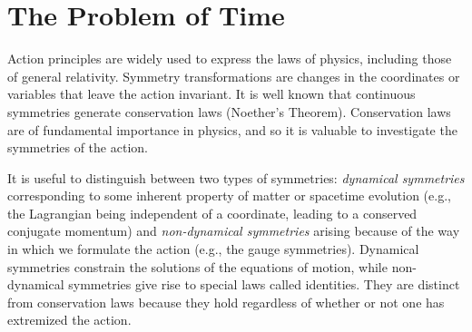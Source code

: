 \chapter{The Problem of Time\label{appen:problemoftime}}

Action principles are widely used to express the laws of physics, including those of
general relativity.  Symmetry transformations are changes in the coordinates or
variables that leave the action invariant. It is well known that continuous symmetries
generate conservation laws (Noether’s Theorem). Conservation laws are of fundamental importance in physics, and so it is valuable to investigate the symmetries of the action.

It is useful to distinguish between two types of symmetries: \emph{dynamical symmetries}
corresponding to some inherent property of matter or spacetime evolution (e.g., the
Lagrangian being independent of a coordinate, leading to a conserved conjugate momentum) 
and \emph{non-dynamical symmetries} arising because of the way in which we formulate
the action (e.g., the gauge symmetries). Dynamical symmetries constrain the solutions
of the equations of motion, while non-dynamical symmetries give rise to special laws
called identities. They are distinct from conservation laws because they hold regardless of whether
or not one has extremized the action.

